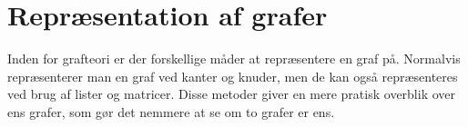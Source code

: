 \section{Repræsentation af grafer}
Inden for grafteori er der forskellige måder at repræsentere en graf på. Normalvis repræsenterer man en graf ved kanter og knuder, men de kan også repræsenteres ved brug af lister og matricer. Disse metoder giver en mere pratisk overblik over ens grafer, som gør det nemmere at se om to grafer er ens.
